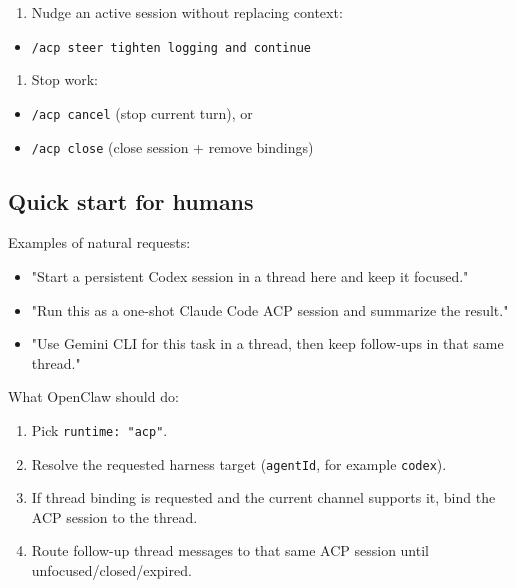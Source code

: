\begin{enumerate}
  \item Nudge an active session without replacing context:
\end{enumerate}

\begin{itemize}
  \item \texttt{/acp steer tighten logging and continue}
\end{itemize}

\begin{enumerate}
  \item Stop work:
\end{enumerate}

\begin{itemize}
  \item \texttt{/acp cancel} (stop current turn), or
  \item \texttt{/acp close} (close session + remove bindings)
\end{itemize}


\subsection{Quick start for humans}


Examples of natural requests:

\begin{itemize}
  \item "Start a persistent Codex session in a thread here and keep it focused."
  \item "Run this as a one-shot Claude Code ACP session and summarize the result."
  \item "Use Gemini CLI for this task in a thread, then keep follow-ups in that same thread."
\end{itemize}


What OpenClaw should do:

\begin{enumerate}
  \item Pick \texttt{runtime: "acp"}.
  \item Resolve the requested harness target (\texttt{agentId}, for example \texttt{codex}).
  \item If thread binding is requested and the current channel supports it, bind the ACP session to the thread.
  \item Route follow-up thread messages to that same ACP session until unfocused/closed/expired.
\end{enumerate}


